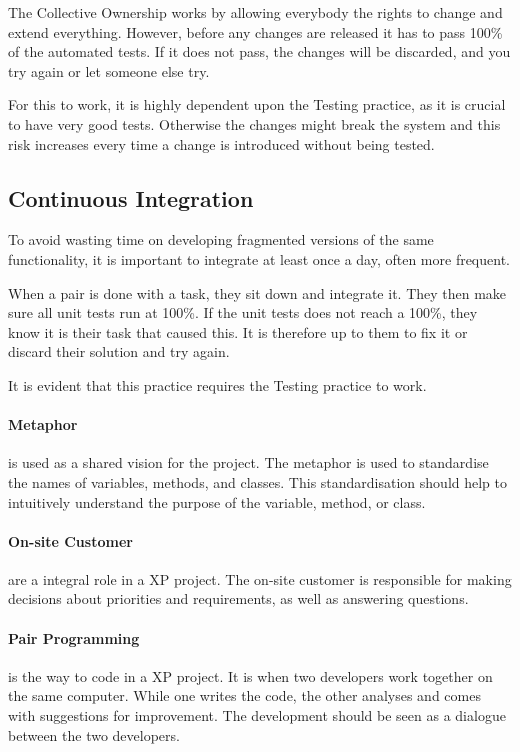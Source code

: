 The Collective Ownership works by allowing everybody the rights to change and extend everything.
However, before any changes are released it has to pass 100\% of the automated tests.
If it does not pass, the changes will be discarded, and you try again or let someone else try.

For this to work, it is highly dependent upon the Testing practice, as it is crucial to have very good tests.
Otherwise the changes might break the system and this risk increases every time a change is introduced without being tested.

\subsection{Continuous Integration}
To avoid wasting time on developing fragmented versions of the same functionality, it is important to integrate at least once a day, often more frequent.

When a pair is done with a task, they sit down and integrate it.
They then make sure all unit tests run at 100\%.
If the unit tests does not reach a 100\%, they know it is their task that caused this.
It is therefore up to them to fix it or discard their solution and try again.

It is evident that this practice requires the Testing practice to work.



\paragraph{Metaphor} is used as a shared vision for the project.
The metaphor is used to standardise the names of variables, methods, and classes. 
This standardisation should help to intuitively understand the purpose of the variable, method, or class.

\paragraph{On-site Customer} are a integral role in a XP project.
The on-site customer is responsible for making decisions about priorities and requirements, as well as answering questions.

\paragraph{Pair Programming} is the way to code in a XP project.
It is when two developers work together on the same computer.
While one writes the code, the other analyses and comes with suggestions for improvement.
The development should be seen as a dialogue between the two developers.

